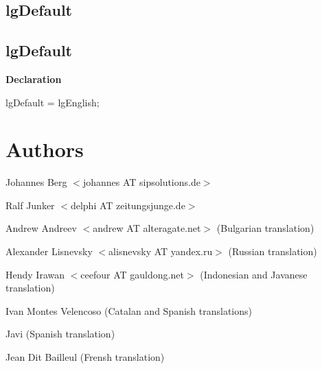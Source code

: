 \documentclass{report}
\newif\ifpdf
\begin{document}
\subsection*{\large{\textbf{lgDefault}}\normalsize\hspace{1ex}\hrulefill}
\else
\subsection*{lgDefault}
\fi
\label{PasDoc_Languages-lgDefault}
\begin{list}{}{
\setlength{\itemindent}{0cm}
\setlength{\listparindent}{0cm}
\setlength{\leftmargin}{\evensidemargin}
\addtolength{\leftmargin}{\tmplength}
\settowidth{\labelsep}{X}
\addtolength{\leftmargin}{\labelsep}
\setlength{\labelwidth}{\tmplength}
}
\item[\textbf{Declaration}\hfill]
\ifpdf
\begin{flushleft}
\fi
\begin{ttfamily}
lgDefault = lgEnglish;\end{ttfamily}

\ifpdf
\end{flushleft}
\fi

\end{list}
\section{Authors}
\par
Johannes Berg {$<$}johannes AT sipsolutions.de{$>$}

\par
Ralf Junker {$<$}delphi AT zeitungsjunge.de{$>$}

\par
Andrew Andreev {$<$}andrew AT alteragate.net{$>$} (Bulgarian translation)

\par
Alexander Lisnevsky {$<$}alisnevsky AT yandex.ru{$>$} (Russian translation)

\par
Hendy Irawan {$<$}ceefour AT gauldong.net{$>$} (Indonesian and Javanese translation)

\par
Ivan Montes Velencoso (Catalan and Spanish translations)

\par
Javi (Spanish translation)

\par
Jean Dit Bailleul (Frensh translation)
\end{document}
